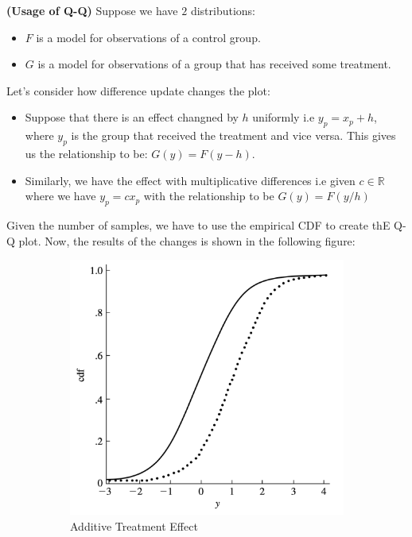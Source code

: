 \begin{remark}{\textbf{(Usage of Q-Q)}}
    Suppose we have $2$ distributions:
    \begin{itemize}
        \item $F$ is a model for observations of a control group. 
        \item $G$ is a model for observations of a group that has received some treatment. 
    \end{itemize}
    Let's consider how difference update changes the plot:
    \begin{itemize}
        \item Suppose that there is an effect changned by $h$ uniformly i.e $y_p = x_p + h$, where $y_p$ is the group that received the treatment and vice versa. This gives us the relationship to be: $G(y) = F(y - h)$. 
        \item Similarly, we have the effect with multiplicative differences i.e given $c \in \mathbb{R}$ where we have $y_p = cx_p$ with the relationship to be $G(y) = F(y/h)$
    \end{itemize}
    Given the number of samples, we have to use the empirical CDF to create thE Q-Q plot. Now, the results of the changes is shown in the following figure:
    \begin{figure}[H]
    \centering
    \begin{subfigure}{.5\textwidth}
        \centering
        \includegraphics[width=0.7\linewidth]{img/img3.png}
        \caption{Additive Treatment Effect}
        \label{fig:1-sub1}
    \end{subfigure}%
    \begin{subfigure}{.5\textwidth}
        \centering

\end{subfigure}
\end{figure}
\end{remark}
